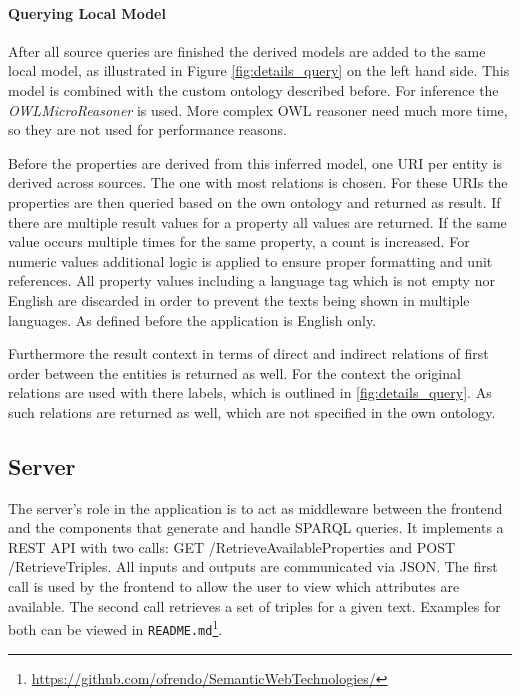 \paragraph{Querying Local Model}
After all source queries are finished the derived models are added to the same local model, as illustrated in Figure \ref{fig:details_query} on the left hand side. This model is combined with the custom ontology described before. For inference the \textit{OWLMicroReasoner} is used. More complex OWL reasoner need much more time, so they are not used for performance reasons. 

Before the properties are derived from this inferred model, one URI per entity is derived across sources. The one with most relations is chosen. 
For these URIs the properties are then queried based on the own ontology and returned as result. If there are multiple result values for a property all values are returned. If the same value occurs multiple times for the same property, a count is increased. For numeric values additional logic is applied to ensure proper formatting and unit references. All property values including a language tag which is not empty nor English are discarded in order to prevent the texts being shown in multiple languages. As defined before the application is English only. 

Furthermore the result context in terms of direct and indirect relations of first order between the entities is returned as well. For the context the original relations are used with there labels, which is outlined in \ref{fig:details_query}. As such relations are returned as well, which are not specified in the own ontology. 

\subsection{Server} 
\label{sec:server}
The server's role in the application is to act as middleware between the frontend and the components that generate and handle SPARQL queries. It implements a REST API with two calls: GET /RetrieveAvailableProperties and POST /RetrieveTriples. All inputs and outputs are communicated via JSON. The first call is used by the frontend to allow the user to view which attributes are available. The second call retrieves a set of triples for a given text. Examples for both can be viewed in \texttt{README.md}\footnote{\url{https://github.com/ofrendo/SemanticWebTechnologies/}}. 

